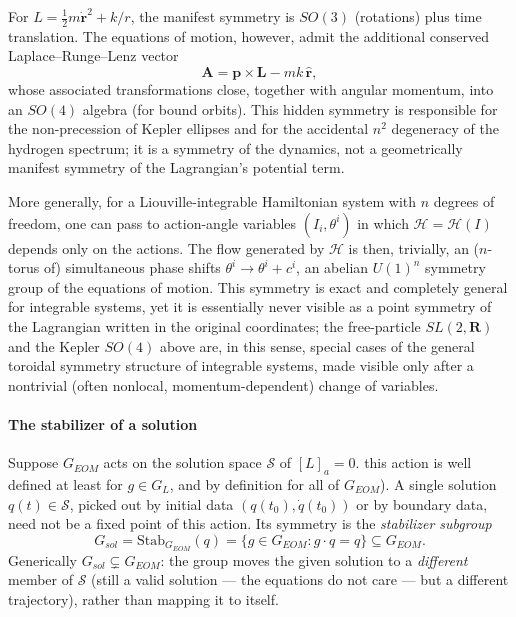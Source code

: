 \begin{example}
For $L = \tfrac12 m\dot{\bm r}^2 + k/r$, the manifest symmetry is $SO(3)$ 
    (rotations) plus time translation. The equations of motion, however, 
    admit the additional conserved Laplace--Runge--Lenz vector
\[
\bm A = \bm p \times \bm L - mk\,\hat{\bm r},
\]
whose associated transformations close, together with angular momentum, into an
    $SO(4)$ algebra (for bound orbits). This hidden symmetry is responsible for
    the non-precession of Kepler ellipses and for the accidental $n^2$
    degeneracy of the hydrogen spectrum; it is a symmetry of the dynamics, not
    a geometrically manifest symmetry of the Lagrangian's potential term.
\end{example}

\begin{example}
More generally, for a Liouville-integrable Hamiltonian system with $n$ degrees
    of freedom, one can pass to action-angle variables $(I_i,\theta^i)$ in
    which $\mathcal{H} = \mathcal{H}(I)$ depends only on the actions. 
    The flow generated by
    $\mathcal{H}$ is then, trivially, an ($n$-torus of) simultaneous phase shifts
    $\theta^i \to \theta^i+c^i$, an abelian $U(1)^n$ symmetry group of the
    equations of motion. This symmetry is exact and completely general for
    integrable systems, yet it is essentially never visible as a point symmetry
    of the Lagrangian written in the original coordinates; the free-particle
    $SL(2,\mathbf R)$ and the Kepler $SO(4)$ above are, in this sense, special
    cases of the general toroidal symmetry structure of integrable systems,
    made visible only after a nontrivial (often nonlocal, momentum-dependent)
    change of variables.
\end{example}

\paragraph{The stabilizer of a solution}
Suppose $G_{EOM}$ acts on the solution space $\mathcal S$ of $[L]_a=0$.
 this action is well defined at least for
$g\in G_L$, and by definition for all of $G_{EOM}$). A single solution
$q(t)\in\mathcal S$, picked out by initial data $(q(t_0),\dot q(t_0))$ or by
boundary data, need not be a fixed point of this action. Its symmetry is the
\emph{stabilizer subgroup}
\[
    G_{sol}=\mathrm{Stab}_{G_{EOM}}(q) = \{ g\in G_{EOM} : g\cdot q
    = q \} \subseteq G_{EOM} .
\]
Generically $G_{sol} \subsetneq G_{EOM}$: the group moves the given
solution to a \emph{different} member of $\mathcal S$ (still a valid solution —
the equations do not care — but a different trajectory), rather than mapping it
to itself.

